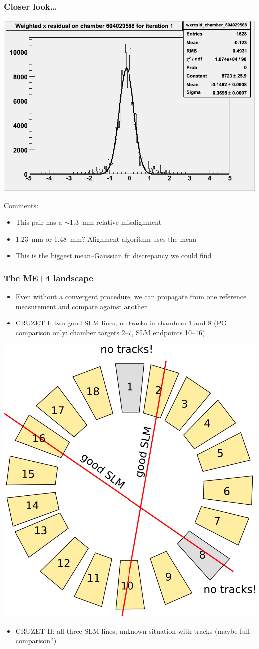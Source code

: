 \documentclass[compress]{beamer}
\begin{document}
\begin{frame}
\frametitle{Closer look\ldots}

\begin{center}
\includegraphics[width=0.8\linewidth]{wxresid_chamber_604029568_chi2cut.png}
\end{center}

\small
Comments:
\begin{itemize}
\item This pair has a $\sim$1.3~mm relative misalignment
\item 1.23~mm or 1.48~mm?  Alignment algorithm uses the mean
\item This is the biggest mean--Gaussian fit discrepancy we could find
\end{itemize}
\end{frame}

\begin{frame}
\frametitle{The ME+4 landscape}
\small
\begin{itemize}
\item Even without a convergent procedure, we can propagate from one reference measurement and compare against another
\item CRUZET-I: two good SLM lines, no tracks in chambers 1 and 8 (PG comparison only: chamber targets 2--7, SLM endpoints 10--16)
\end{itemize}
\begin{center}
\includegraphics[width=0.4\linewidth]{landscape.png}
\end{center}
\begin{itemize}
\item CRUZET-II: all three SLM lines, unknown situation with tracks (maybe full comparison?)
\end{itemize}
\end{frame}
\end{document}
